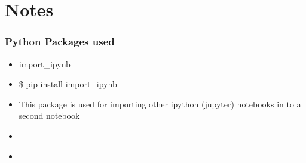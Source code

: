

\chapter*{Notes}




\subsection*{Python Packages used}

\begin{itemize}
    \item import\_ipynb
    \item \$ pip install import\_ipynb
    \item This package is used for importing other ipython (jupyter) notebooks in to a second notebook
    \item ------
    \item 
\end{itemize}{}


